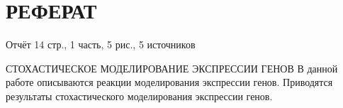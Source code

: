 \section*{РЕФЕРАТ}
Отчёт 14 стр., 1 часть, 5 рис., 5 источников

СТОХАСТИЧЕСКОЕ МОДЕЛИРОВАНИЕ ЭКСПРЕССИИ ГЕНОВ
В данной работе описываются реакции моделирования экспрессии генов. Приводятся результаты стохастического моделирования экспрессии генов.
